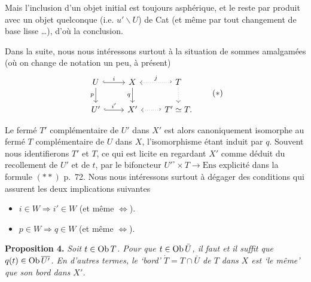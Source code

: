 
Mais l'inclusion d'un objet initial est toujours asphérique, et le reste par produit avec un objet quelconque (i.e. $u'\backslash U$) de Cat (et même par tout changement de base lisse \dots), d'où la conclusion.

Dans la suite, nous nous intéressons surtout à la situation de sommes amalgamées (où on change de notation un peu, à présent)
\[
\begin{tikzcd}
U \arrow[r, hook, "i"] \arrow[d, "p"'] & X \arrow[d, "q"'] & T \arrow[l, hook', dotted, "j"'] \arrow[d, dotted] \\
U' \arrow[r, hook, "i'"] & X' & T' \simeq T. \arrow[l, hook', dotted]
\end{tikzcd}
\tag*{$(*)$}
\]

Le fermé $T'$ complémentaire de $U'$ dans $X'$ est alors canoniquement isomorphe au fermé $T$ complémentaire de $U$ dans $X$, l'isomorphisme étant induit par $q$. Souvent nous identifierons $T'$ et $T$, ce qui est licite en regardant $X'$ comme déduit du recollement de $U'$ et de $t$, par le bifoncteur $U'^{\circ}\times T\longrightarrow \mathrm{Ens}$ explicité dans la formule $(**)$ p.~72. Nous nous intéressons surtout à dégager des conditions qui assurent les deux implications suivantes

\begin{itemize}
\item[a)] $i\in W\Longrightarrow i'\in W$ (et même $\Longleftrightarrow$).
\item[b)] $p\in W\Longrightarrow q\in W$ (et même $\Longleftrightarrow$).
\end{itemize}

\textbf{Proposition 4.} \textit{Soit $t\in\mathrm{Ob}\, T$. Pour que $t\in\mathrm{Ob}\,\bar{U}$, il faut et il suffit que $q(t)\in\mathrm{Ob}\,\overline{U'}$. En d'autres termes, le `bord' $\dot{T}=T\cap\bar{U}$ de $T$ dans $X$ est `le même' que son bord dans $X'$.}

